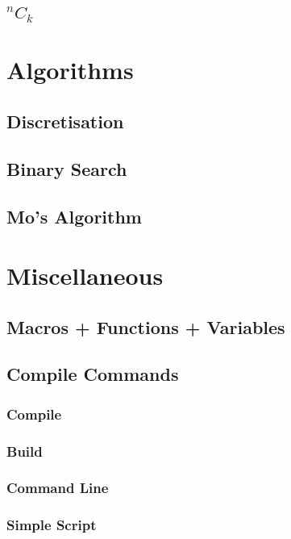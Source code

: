 \documentclass{article}
\begin{document}
\subsection{$^{n}C_{k}$}


\section{Algorithms}
\subsection{Discretisation}

\subsection{Binary Search}

\subsection{Mo's Algorithm}


\section{Miscellaneous}
\subsection{Macros + Functions + Variables}


\subsection{Compile Commands}
\subsubsection{Compile}

\subsubsection{Build}

\subsubsection{Command Line}

\subsubsection{Simple Script}

\end{document}
